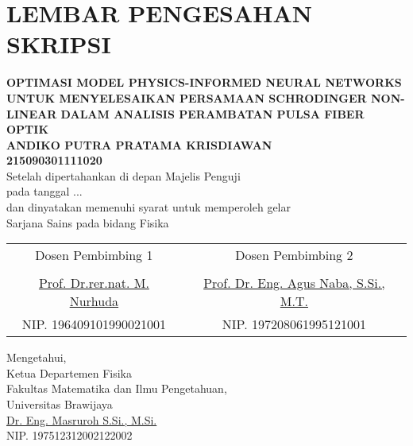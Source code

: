 \chapter*{LEMBAR PENGESAHAN SKRIPSI}

\begin{center}
	\vspace{0.5cm}
	\textbf{OPTIMASI MODEL PHYSICS-INFORMED NEURAL NETWORKS UNTUK MENYELESAIKAN PERSAMAAN SCHRODINGER NON-LINEAR DALAM ANALISIS PERAMBATAN PULSA FIBER OPTIK}\\
	\vspace{0.5cm}
	\textbf{ANDIKO PUTRA PRATAMA KRISDIAWAN}\\
	\textbf{215090301111020}\\
	\vspace{0.5cm}
	Setelah dipertahankan di depan Majelis Penguji \\pada tanggal ... \\ dan dinyatakan memenuhi syarat untuk memperoleh gelar\\ Sarjana  Sains pada bidang Fisika\\
	\vspace{0.5cm}
\end{center}

\begin{center}
\begin{tabular}{c c} %
	Dosen Pembimbing 1 & Dosen Pembimbing 2\\
	\vspace{1cm} & \vspace{1cm} \\ 
	\underline{\small Prof. Dr.rer.nat. M. Nurhuda} & 
	\underline{\small Prof. Dr. Eng. Agus Naba, S.Si., M.T.} \\
	NIP. 196409101990021001 & NIP. 197208061995121001 \\
\end{tabular}     
\end{center}

\begin{center}
	Mengetahui,\\
	Ketua Departemen Fisika \\Fakultas Matematika dan Ilmu Pengetahuan,\\
	Universitas Brawijaya\\
	\vspace{2cm}
	\underline{Dr. Eng. Masruroh S.Si., M.Si.}\\
	NIP. 197512312002122002
\end{center}

\cleardoublepage
